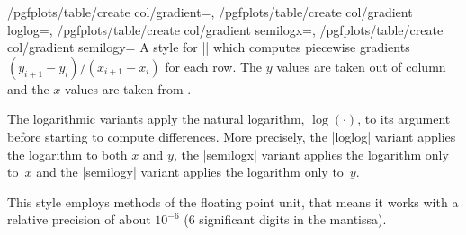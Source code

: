 \begin{keylist}{%
    /pgfplots/table/create col/gradient=,
    /pgfplots/table/create col/gradient loglog=,
    /pgfplots/table/create col/gradient semilogx=,
    /pgfplots/table/create col/gradient semilogy=%
}
    A style for |\pgfplotstablecreatecol| which computes piecewise gradients
    $(y_{i+1} - y_i) / (x_{i+1} - x_i )$ for each row. The $y$ values are taken
    out of column  and the $x$ values are taken from .

    The logarithmic variants apply the natural logarithm, $\log(\cdot)$, to its
    argument before starting to compute differences. More precisely, the
    |loglog| variant applies the logarithm to both $x$ and $y$, the |semilogx|
    variant applies the logarithm only to~$x$ and the |semilogy| variant
    applies the logarithm only to~$y$.
\begin{codeexample}[pre={\begin{lateximage}},post={\end{lateximage}}]
\end{codeexample}

\begin{codeexample}[pre={\begin{lateximage}},post={\end{lateximage}}]
\end{codeexample}
    This style employs methods of the floating point unit, that means it works
    with a relative precision of about $10^{-6}$ ($6$ significant digits in the
    mantissa).
\end{keylist}

